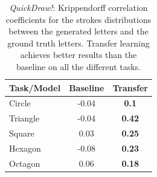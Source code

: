         \begin{table}[!htbp]
          \centering
          \begin{tabular}{l c c} \hline
          Task/Model & Baseline & Transfer\\ \hline
          Circle &  -0.04 &  \textbf{0.1} \\ %
          Triangle & -0.04 & \textbf{0.42} \\ %
          Square &  0.03 &  \textbf{0.25} \\ %
          Hexagon & -0.08 & \textbf{0.23} \\ %
          Octagon & 0.06 & \textbf{0.18} \\ \hline

          \end{tabular}
          \caption{\textit{QuickDraw!}: Krippendorff correlation coefficients for the strokes distributions between the generated letters and the ground truth letters. Transfer learning achieves better results than the baseline on all the different tasks.}
          \label{table:quickdraw_strokes_transfer}
        \end{table}

